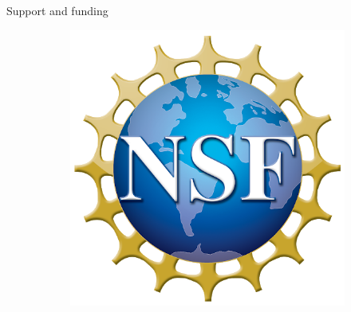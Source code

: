 \documentclass[aspectratio=169]{beamer}
\begin{document}
\begin{frame}{Support and funding}
\begin{figure}
\begin{subfigure}[b]{0.3\textwidth}
         \includegraphics[width=\textwidth]{figures/nsf.png}
     \end{subfigure}
\end{figure}
\vfill
\end{frame}
\end{document}
